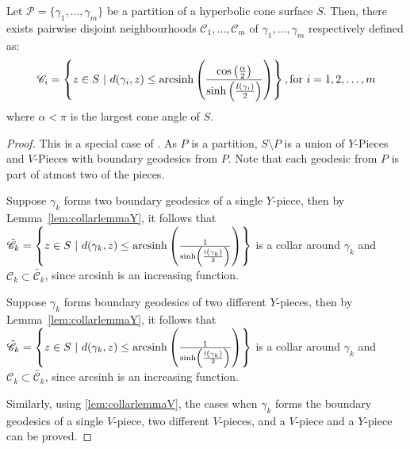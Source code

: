 \begin{lem} \label{lem:collarlemma}
	Let $\mathcal{P} = \{\gamma_1, \ldots, \gamma_m\}$ be a partition of a hyperbolic cone surface $S$. Then, there exists pairwise disjoint neighbourhoods $\mathscr{C}_1, \ldots, \mathscr{C}_m$ of $\gamma_1, \ldots, \gamma_m$ respectively defined as:
		$$\mathscr{C}_i=\left\{z \in S ~\vert~ d(\gamma_i,z) \leq \textup{arcsinh}\left( \frac{\cos\left({\frac{\alpha}{2}}\right)}{ \sinh\left(\frac{l\left(\gamma_i\right)}{2}\right)}\right)\right\},\textup{for } i = 1,2, \ldots,m$$
	where $\alpha < \pi$ is the largest cone angle of $S$.
\end{lem}

\begin{proof}
	This is a special case of \cite[Theorem 3]{PARLIER}. As $P$ is a partition, $S \setminus P$ is a union of $Y$-Pieces and $V$-Pieces with boundary geodesics from $P$. Note that each geodesic from $P$ is part of atmost two of the pieces.
	
	Suppose $\gamma_k$ forms two boundary geodesics of a single $Y$-piece, then by Lemma~\ref{lem:collarlemmaY}, it follows that $\tilde{\mathscr{C}_k} = \left\{z \in S ~\vert~ d(\gamma_k,z) \leq \textup{arcsinh}\left( \frac{1}{ \sinh\left(\frac{l\left(\gamma_k\right)}{2}\right)}\right)\right\}$ 
	is a collar around $\gamma_k$ and $\mathscr{C}_k \subset \tilde{\mathscr{C}_k}$, since arcsinh is an increasing function.
	
	Suppose $\gamma_k$ forms boundary geodesics of two different $Y$-pieces, then by Lemma~\ref{lem:collarlemmaY}, it follows that $\tilde{\mathscr{C}_k} = \left\{z \in S ~\vert~ d(\gamma_k,z) \leq \textup{arcsinh}\left( \frac{1}{ \sinh\left(\frac{l\left(\gamma_k\right)}{2}\right)}\right)\right\}$ is a collar around $\gamma_k$ and $\mathscr{C}_k \subset \tilde{\mathscr{C}_k}$, since arcsinh is an increasing function.
	
	Similarly, using \ref{lem:collarlemmaV}, the cases when $\gamma_k$ forms the boundary geodesics of a single $V$-piece, two different $V$-pieces, and a $V$-piece and a $Y$-piece can be proved. 
	
\end{proof}
%
%
